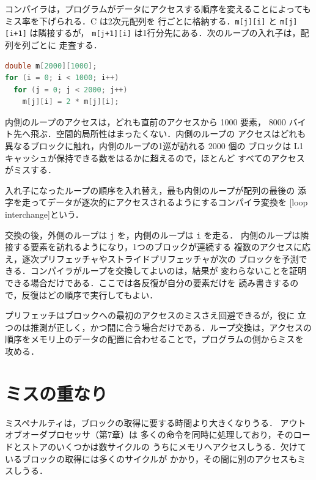 \documentclass[../main.tex]{subfiles}
\begin{document}
コンパイラは，プログラムがデータにアクセスする順序を変えることによっても
ミス率を下げられる．C は2次元配列を
行ごとに格納する．\texttt{m[j][i]} と \texttt{m[j][i+1]} は隣接するが，
\texttt{m[j+1][i]} は1行分先にある．次のループの入れ子は，配列を列ごとに
走査する．
\begin{lstlisting}[language=C, numbers=none]
double m[2000][1000];
for (i = 0; i < 1000; i++)
  for (j = 0; j < 2000; j++)
    m[j][i] = 2 * m[j][i];
\end{lstlisting}
内側のループのアクセスは，どれも直前のアクセスから \num{1000} 要素，
\num{8000} バイト先へ飛ぶ．空間的局所性はまったくない．内側のループの
アクセスはどれも異なるブロックに触れ，内側のループの1巡が訪れる 2000 個の
ブロックは L1 キャッシュが保持できる数をはるかに超えるので，ほとんど
すべてのアクセスがミスする．

\begin{definition}[ループ交換]
  入れ子になったループの順序を入れ替え，最も内側のループが配列の最後の
  添字を走ってデータが逐次的にアクセスされるようにするコンパイラ変換を
  [loop interchange]という．
\end{definition}

交換の後，外側のループは \texttt{j} を，内側のループは \texttt{i} を走る．
内側のループは隣接する要素を訪れるようになり，1つのブロックが連続する
複数のアクセスに応え，逐次プリフェッチャやストライドプリフェッチャが次の
ブロックを予測できる．コンパイラがループを交換してよいのは，結果が
変わらないことを証明できる場合だけである．ここでは各反復が自分の要素だけを
読み書きするので，反復はどの順序で実行してもよい．

\begin{keypoint}
  プリフェッチはブロックへの最初のアクセスのミスさえ回避できるが，役に
  立つのは推測が正しく，かつ間に合う場合だけである．ループ交換は，アクセスの
  順序をメモリ上のデータの配置に合わせることで，プログラムの側からミスを
  攻める．
\end{keypoint}

\section{ミスの重なり}
\label{sec:l14-overlap}

ミスペナルティは，ブロックの取得に要する時間より大きくなりうる．
アウトオブオーダプロセッサ（第7章）は
多くの命令を同時に処理しており，そのロードとストアのいくつかは数サイクルの
うちにメモリへアクセスしうる．欠けているブロックの取得には多くのサイクルが
かかり，その間に別のアクセスもミスしうる．
\end{document}
